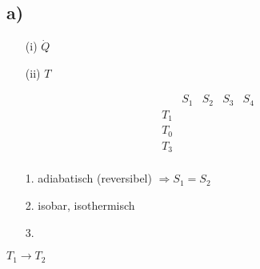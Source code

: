 

\subsection*{a)}

\begin{itemize}
    \item[(i)] \(\dot{Q}\)
    \item[(ii)] \(T\)
\end{itemize}

\[
\begin{array}{c|c|c|c|c}
    & S_1 & S_2 & S_3 & S_4 \\
    \hline
    T_1 & & & & \\
    T_0 & & & & \\
    T_3 & & & & \\
\end{array}
\]

\begin{itemize}
    \item[1.] adiabatisch (reversibel) \(\Rightarrow S_1 = S_2\)
    \item[2.] isobar, isothermisch
    \item[3.] 
\end{itemize}

\(T_1 \rightarrow T_2\)